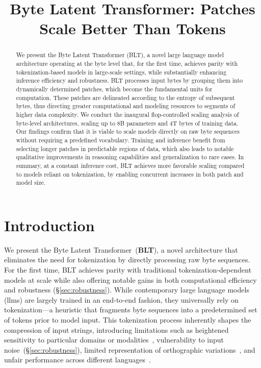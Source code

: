 \title{Byte Latent Transformer: Patches Scale Better Than Tokens}

\begin{abstract}
We present the Byte Latent Transformer ({\textsc BLT}), a novel large language model architecture operating at the byte level that, for the first time, achieves parity with tokenization-based models in large-scale settings, while substantially enhancing inference efficiency and robustness.
{\textsc BLT} processes input bytes by grouping them into dynamically determined patches, which become the fundamental units for computation. These patches are delineated according to the entropy of subsequent bytes, thus directing greater computational and modeling resources to segments of higher data complexity. We conduct the inaugural flop-controlled scaling analysis of byte-level architectures, scaling up to 8B parameters and 4T bytes of training data. Our findings confirm that it is viable to scale models directly on raw byte sequences without requiring a predefined vocabulary. Training and inference benefit from selecting longer patches in predictable regions of data, which also leads to notable qualitative improvements in reasoning capabilities and generalization to rare cases. In summary, at a constant inference cost, {\textsc BLT} achieves more favorable scaling compared to models reliant on tokenization, by enabling concurrent increases in both patch and model size.
\end{abstract}

\section{Introduction}
\label{section:intro}

We present the Byte Latent Transformer~(\textbf{BLT}), a novel architecture that eliminates the need for tokenization by directly processing raw byte sequences. For the first time, BLT achieves parity with traditional tokenization-dependent models at scale while also offering notable gains in both computational efficiency and robustness (\S\ref{sec:robustness}). While contemporary large language models (llms) are largely trained in an end-to-end fashion, they universally rely on tokenization—a heuristic that fragments byte sequences into a predetermined set of tokens prior to model input. This tokenization process inherently shapes the compression of input strings, introducing limitations such as heightened sensitivity to particular domains or modalities~\citep{dagangetting}, vulnerability to input noise~(\S\ref{sec:robustness}), limited representation of orthographic variations~\citep{edman2024cute}, and unfair performance across different languages~\citep{liang2023xlm,petrov2024language,limisiewicz2024myte}.


